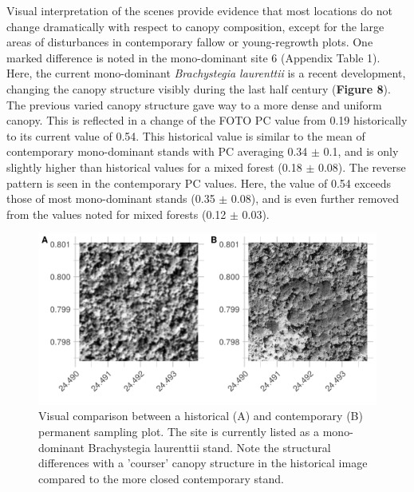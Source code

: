 \documentclass[remote sensing,article,submit,moreauthors,pdftex]{mdpi}
\begin{document}
Visual interpretation of the scenes provide evidence that most locations
do not change dramatically with respect to canopy composition, except
for the large areas of disturbances in contemporary fallow or
young-regrowth plots. One marked difference is noted in the
mono-dominant site 6 (Appendix Table 1). Here, the current mono-dominant
\emph{Brachystegia laurenttii} is a recent development, changing the
canopy structure visibly during the last half century (\textbf{Figure
8}). The previous varied canopy structure gave way to a more dense and
uniform canopy. This is reflected in a change of the FOTO PC value from
0.19 historically to its current value of 0.54. This historical value is
similar to the mean of contemporary mono-dominant stands with PC
averaging 0.34 \(\pm\) 0.1, and is only slightly higher than historical
values for a mixed forest (0.18 \(\pm\) 0.08). The reverse pattern is
seen in the contemporary PC values. Here, the value of 0.54 exceeds
those of most mono-dominant stands (0.35 \(\pm\) 0.08), and is even
further removed from the values noted for mixed forests (0.12 \(\pm\)
0.03).

\begin{figure}

{\centering \includegraphics[width=1\linewidth]{./figures/visual_comparison_psp} 

}

\caption{Visual comparison between a historical (A) and contemporary (B) permanent sampling plot. The site is currently listed as a mono-dominant Brachystegia laurenttii stand. Note the structural differences with a 'courser' canopy structure in the historical image compared to the more closed contemporary stand.}\label{fig:unnamed-chunk-12}
\end{figure}
\end{document}
